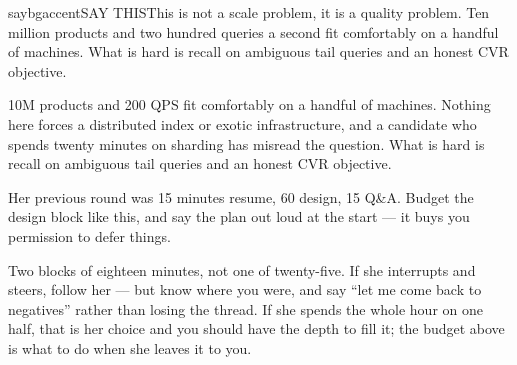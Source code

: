 \documentclass[10pt,twoside]{book}
\makeatletter
\newcommand{\csection}[1]{\par\vspace{13pt}\noindent{\sffamily\large\bfseries\color{ink}\raggedright #1\par}\vspace{4pt}}
\newenvironment{calloutsay}{\begin{co@box}{saybg}{accent}{SAY THIS}}{\end{co@box}}
\makeatother
\begin{document}
\begin{calloutsay}This is not a scale problem, it is a quality problem. Ten million products and two hundred queries a second fit comfortably on a handful of machines. What is hard is recall on ambiguous tail queries and an honest CVR objective.\end{calloutsay}
10M products and 200 QPS fit comfortably on a handful of machines. Nothing here forces a distributed index or exotic infrastructure, and a candidate who spends twenty minutes on sharding has misread the question. What is hard is recall on ambiguous tail queries and an honest CVR objective.\par
\csection{The sixty minutes}
Her previous round was 15 minutes resume, 60 design, 15 Q\&A. Budget the design block like this, and say the plan out loud at the start --- it buys you permission to defer things.\par
\par{}\par\medskip
Two blocks of eighteen minutes, not one of twenty-five. If she interrupts and steers, follow her --- but know where you were, and say ``let me come back to negatives'' rather than losing the thread. If she spends the whole hour on one half, that is her choice and you should have the depth to fill it; the budget above is what to do when she leaves it to you.\par
\end{document}

